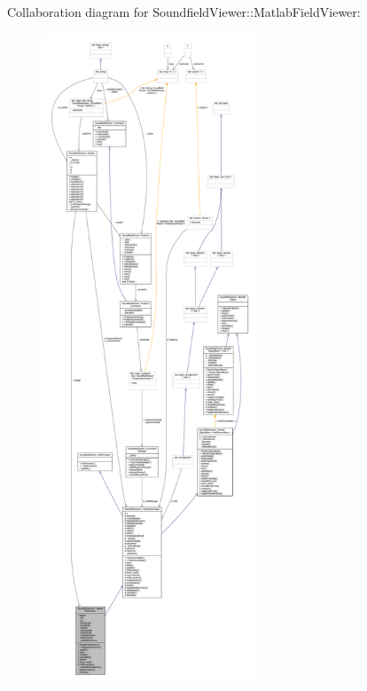 Collaboration diagram for Soundfield\-Viewer\-:\-:Matlab\-Field\-Viewer\-:\nopagebreak
\begin{figure}[H]
\begin{center}
\leavevmode
\includegraphics[height=550pt]{dc/dc7/classSoundfieldViewer_1_1MatlabFieldViewer__coll__graph}
\end{center}
\end{figure}
